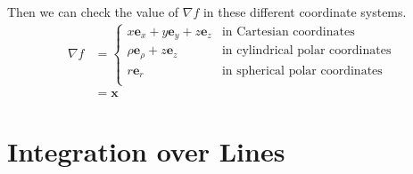 \documentclass{article}
\begin{document}
Then we can check the value of $\nabla f$ in these different coordinate systems.
\begin{align*}
    \nabla f & = \begin{cases}
        x \bm e_x + y \bm e_y + z \bm e_z & \text{in Cartesian coordinates}         \\
        \rho \bm e_\rho + z \bm e_z       & \text{in cylindrical polar coordinates} \\
        r \bm e_r                         & \text{in spherical polar coordinates}   \\
    \end{cases} \\
             & = \bm x
\end{align*}

\section{Integration over Lines}
\end{document}
